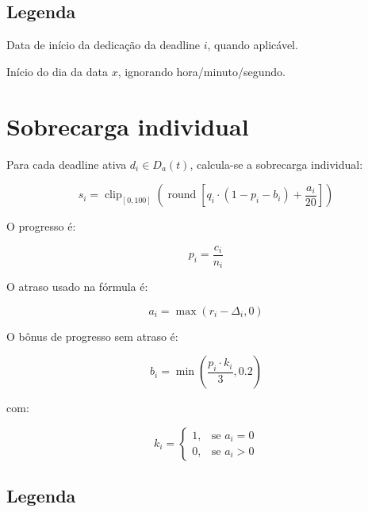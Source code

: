 \documentclass[12pt,a4paper]{article}
\begin{document}
\subsection*{Legenda}

\begin{description}[leftmargin=2.2cm]
    \item[$S_i$] Data de início da dedicação da deadline $i$, quando aplicável.
    \item[$\operatorname{dia}(x)$] Início do dia da data $x$, ignorando hora/minuto/segundo.
\end{description}

\section{Sobrecarga individual}

Para cada deadline ativa $d_i \in D_a(t)$, calcula-se a sobrecarga individual:

\[
s_i =
\operatorname{clip}_{[0,100]}
\left(
\operatorname{round}
\left[
q_i \cdot
\left(
1 - p_i - b_i
\right)
+
\frac{a_i}{20}
\right]
\right)
\]

O progresso é:

\[
p_i = \frac{c_i}{n_i}
\]

O atraso usado na fórmula é:

\[
a_i = \max(r_i - \Delta_i, 0)
\]

O bônus de progresso sem atraso é:

\[
b_i =
\min
\left(
\frac{p_i \cdot k_i}{3},
0.2
\right)
\]

com:

\[
k_i =
\begin{cases}
1, & \text{se } a_i = 0 \\
0, & \text{se } a_i > 0
\end{cases}
\]

\subsection*{Legenda}
\end{document}
